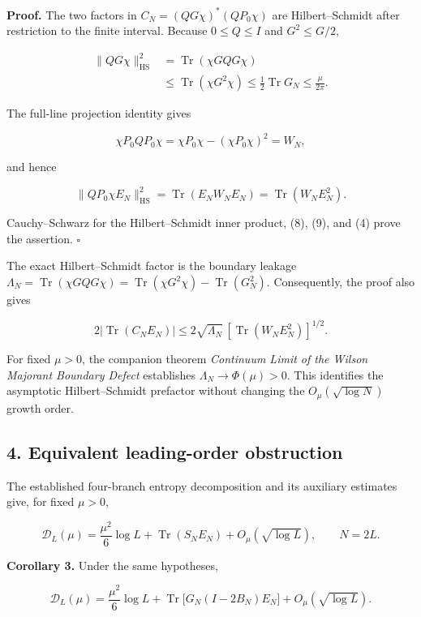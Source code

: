 \documentclass[
  10pt,
  a4paper,
]{article}
\begin{document}
\textbf{Proof.} The two factors in \(C_N=(QG\chi)^*(QP_0\chi)\) are Hilbert--Schmidt after restriction to the finite interval. Because \(0\le Q\le I\) and \(G^2\le G/2\),

\[
\begin{aligned}
\|QG\chi\|_{\mathrm{HS}}^2
&=\operatorname{Tr}(\chi GQG\chi)\\
&\le\operatorname{Tr}(\chi G^2\chi)
\le\tfrac12\operatorname{Tr}G_N
\le\frac\mu{2\pi}.
\end{aligned}
\tag{8}
\]

The full-line projection identity gives

\[
\chi P_0QP_0\chi
=\chi P_0\chi-(\chi P_0\chi)^2=W_N,
\]

and hence

\[
\|QP_0\chi E_N\|_{\mathrm{HS}}^2
=\operatorname{Tr}(E_NW_NE_N)
=\operatorname{Tr}(W_NE_N^2).
\tag{9}
\]

Cauchy--Schwarz for the Hilbert--Schmidt inner product, (8), (9), and (4) prove the assertion. \(\square\)

The exact Hilbert--Schmidt factor is the boundary leakage \(\Lambda_N=\operatorname{Tr}(\chi GQG\chi)=\operatorname{Tr}(\chi G^2\chi)-\operatorname{Tr}(G_N^2)\). Consequently, the proof also gives

\[
2|\operatorname{Tr}(C_NE_N)|\le 2\sqrt{\Lambda_N}\,[\operatorname{Tr}(W_NE_N^2)]^{1/2}.
\]

For fixed \(\mu>0\), the companion theorem \emph{Continuum Limit of the Wilson Majorant Boundary Defect} establishes \(\Lambda_N\to\Phi(\mu)>0\). This identifies the asymptotic Hilbert--Schmidt prefactor without changing the \(O_\mu(\sqrt{\log N})\) growth order.

\subsection{4. Equivalent leading-order obstruction}\label{equivalent-leading-order-obstruction}

The established four-branch entropy decomposition and its auxiliary estimates give, for fixed \(\mu>0\),

\[
\mathcal D_L(\mu)=\frac{\mu^2}{6}\log L
+\operatorname{Tr}(S_NE_N)+O_\mu(\sqrt{\log L}),
\qquad N=2L.
\tag{10}
\]

\textbf{Corollary 3.} Under the same hypotheses,

\[
\boxed{
\mathcal D_L(\mu)=\frac{\mu^2}{6}\log L
+\operatorname{Tr}\bigl[G_N(I-2B_N)E_N\bigr]
+O_\mu(\sqrt{\log L}).}
\tag{11}
\]
\end{document}
